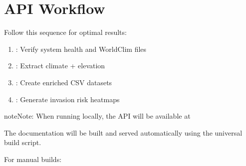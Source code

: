 \documentclass[letterpaper,10pt,english]{sphinxmanual}
\begin{document}
\chapter{API Workflow}
\label{\detokenize{index:api-workflow}}
\sphinxAtStartPar
Follow this sequence for optimal results:
\begin{enumerate}
%
\item {} 
\sphinxAtStartPar
{}:  \sphinxhyphen{} Verify system health and WorldClim files

\item {} 
\sphinxAtStartPar
{}:  \sphinxhyphen{} Extract climate + elevation

\item {} 
\sphinxAtStartPar
{}:  \sphinxhyphen{} Create enriched CSV datasets

\item {} 
\sphinxAtStartPar
{}:  \sphinxhyphen{} Generate invasion risk heatmaps

\end{enumerate}

\begin{sphinxadmonition}{note}{Note:}
\sphinxAtStartPar
When running locally, the API will be available at 

\sphinxAtStartPar
The documentation will be built and served automatically using the universal build script.

\sphinxAtStartPar
For manual builds:

\begin{sphinxVerbatim}[commandchars=\\\{\}]
 

   
\end{sphinxVerbatim}
\end{sphinxadmonition}
\end{document}
